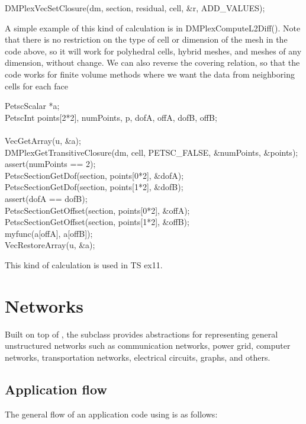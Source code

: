 {{\begin{tabbing}
  DMPlexVecSetClosure(dm, section, residual, cell, \&r, ADD\_VALUES);
\end{tabbing}
A simple example of this kind of calculation is in DMPlexComputeL2Diff(). Note that there is no restriction on the
type of cell or dimension of the mesh in the code above, so it will work for polyhedral cells, hybrid meshes, and meshes
of any dimension, without change. We can also reverse the covering relation, so that the code works for finite volume
methods where we want the data from neighboring cells for each face
\begin{tabbing}
  PetscScalar *a;\\
  PetscInt     points[2*2], numPoints, p, dofA, offA, dofB, offB;\\
\\
  VecGetArray(u, \&a);\\
  DMPlexGetTransitiveClosure(dm, cell, PETSC\_FALSE, \&numPoints, \&points);\\
  assert(numPoints == 2);\\
  PetscSectionGetDof(section, points[0*2], \&dofA);\\
  PetscSectionGetDof(section, points[1*2], \&dofB);\\
  assert(dofA == dofB);\\
  PetscSectionGetOffset(section, points[0*2], \&offA);\\
  PetscSectionGetOffset(section, points[1*2], \&offB);\\
  myfunc(a[offA], a[offB]);\\
  VecRestoreArray(u, \&a);
\end{tabbing}
This kind of calculation is used in TS ex11.

\section{Networks}
Built on top of , the  subclass provides abstractions for representing general unstructured 
networks such as communication networks, power grid, computer networks, transportation networks, electrical circuits, graphs, and others. 

\subsection{Application flow}
The general flow of an application code using  is as follows:

}}
